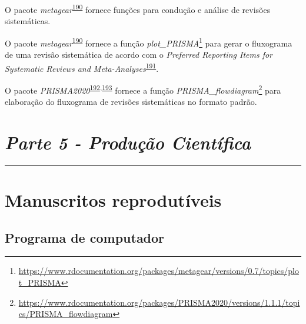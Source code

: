 \documentclass[
  a4paper,
]{book}
\renewcommand{\href}[2]{#2\footnote{\url{#1}}}
\newenvironment{infobox}[1]
  {
  \begin{itemize}
  \renewcommand{\labelitemi}{
    \raisebox{-.7\height}[0pt][0pt]{
      {\setkeys{Gin}{width=3em,keepaspectratio}
        \texttt{[image: \#1]}}
    }
  }
  \setlength{\fboxsep}{1em}
  \begin{blackbox}
  \item
  }
  {
  \end{blackbox}
  \end{itemize}
  }
\begin{document}
\begin{infobox}{images/Rlogo}
O pacote \emph{metagear}\textsuperscript{\protect\hyperlink{ref-metagear}{190}} fornece funções para condução e análise de revisões sistemáticas.

\end{infobox}

\begin{infobox}{images/Rlogo}
O pacote \emph{metagear}\textsuperscript{\protect\hyperlink{ref-metagear}{190}} fornece a função \href{https://www.rdocumentation.org/packages/metagear/versions/0.7/topics/plot_PRISMA}{\emph{plot\_PRISMA}} para gerar o fluxograma de uma revisão sistemática de acordo com o \emph{Preferred Reporting Items for Systematic Reviews and Meta-Analyses}\textsuperscript{\protect\hyperlink{ref-Moher2015}{191}}.

\end{infobox}

\begin{infobox}{images/Rlogo}
O pacote \emph{PRISMA2020}\textsuperscript{\protect\hyperlink{ref-PRISMA2020-2}{192},\protect\hyperlink{ref-PRISMA2020}{193}} fornece a função \href{https://www.rdocumentation.org/packages/PRISMA2020/versions/1.1.1/topics/PRISMA_flowdiagram}{\emph{PRISMA\_flowdiagram}} para elaboração do fluxograma de revisões sistemáticas no formato padrão.

\end{infobox}


\hypertarget{parte-5---produuxe7uxe3o-cientuxedfica}{%
\chapter*{\texorpdfstring{\emph{Parte 5 - Produção Científica}}{Parte 5 - Produção Científica}}\label{parte-5---produuxe7uxe3o-cientuxedfica}}

\markboth{}{}
\par\noindent\rule{\textwidth}{0.05in}

\hypertarget{manuscritos-reprodutiveis}{%
\chapter{\texorpdfstring{\textbf{Manuscritos reprodutíveis}}{Manuscritos reprodutíveis}}\label{manuscritos-reprodutiveis}}

\hypertarget{inicio}{%
\section{Programa de computador}\label{inicio}}
\end{document}

